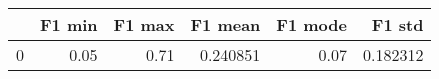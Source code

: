 \begin{tabular}{lrrrrr}
\toprule
{} &  F1 min &  F1 max &   F1 mean &  F1 mode &    F1 std \\
\midrule
0 &    0.05 &    0.71 &  0.240851 &     0.07 &  0.182312 \\
\bottomrule
\end{tabular}
